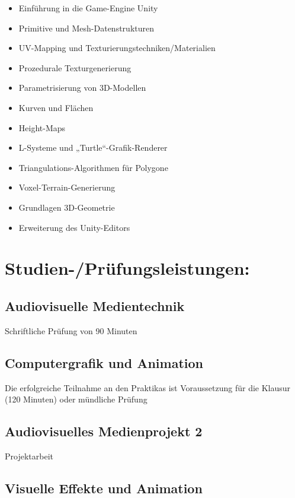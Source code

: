 \begin{itemize}
\tightlist
\item
  Einführung in die Game-Engine Unity
\item
  Primitive und Mesh-Datenstrukturen
\item
  UV-Mapping und Texturierungstechniken/Materialien
\item
  Prozedurale Texturgenerierung
\item
  Parametrisierung von 3D-Modellen
\item
  Kurven und Flächen
\item
  Height-Maps
\item
  L-Systeme und „Turtle``-Grafik-Renderer
\item
  Triangulations-Algorithmen für Polygone
\item
  Voxel-Terrain-Generierung
\item
  Grundlagen 3D-Geometrie
\item
  Erweiterung des Unity-Editors
\end{itemize}

\section*{Studien-/Prüfungsleistungen:}\label{studien-pruxfcfungsleistungen-23}

\subsection*{Audiovisuelle
Medientechnik}\label{audiovisuelle-medientechnik-2}

Schriftliche Prüfung von 90 Minuten

\subsection*{Computergrafik und
Animation}\label{computergrafik-und-animation-2}

Die erfolgreiche Teilnahme an den Praktikas ist Voraussetzung für die
Klausur (120 Minuten) oder mündliche Prüfung

\subsection*{Audiovisuelles Medienprojekt
2}\label{audiovisuelles-medienprojekt-2-2}

Projektarbeit

\subsection*{Visuelle Effekte und
Animation}\label{visuelle-effekte-und-animation-2}

